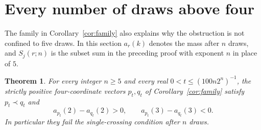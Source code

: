 \documentclass[11pt,a4paper]{article}
\newtheorem{theorem}{Theorem}
\begin{document}
\section{Every number of draws above four}
The family in Corollary~\ref{cor:family} also explains why the obstruction
is not confined to five draws. In this section $a_r(k)$ denotes the mass
after $n$ draws, and $S_j(r;n)$ is the subset sum in the preceding proof
with exponent $n$ in place of $5$.

\begin{theorem}\label{thm:alln}
For every integer $n\geq5$ and every real
$0<t\leq (100n2^n)^{-1}$, the strictly positive four-coordinate vectors
$p_t,q_t$ of Corollary~\ref{cor:family} satisfy $p_t\prec q_t$ and
\[
 a_{p_t}(2)-a_{q_t}(2)>0,\qquad
 a_{p_t}(3)-a_{q_t}(3)<0.
\]
In particular they fail the single-crossing condition after $n$ draws.
\end{theorem}
\end{document}
